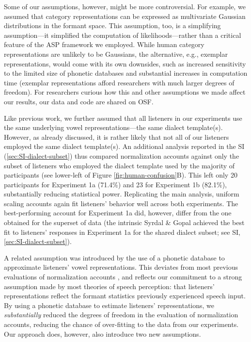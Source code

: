 \documentclass[preprint]{JASA}
\begin{document}
Some of our assumptions, however, might be more controversial. For example, we assumed that category representations can be expressed as multivariate Gaussian distributions in the formant space. This assumption, too, is a simplifying assumption---it simplified the computation of likelihoods---rather than a critical feature of the ASP framework we employed. While human category representations are unlikely to be Gaussians, the alternative, e.g., exemplar representations, would come with its own downsides, such as increased sensitivity to the limited size of phonetic databases and substantial increases in computation time (exemplar representations afford researchers with much larger degrees of freedom). For researchers curious how this and other assumptions we made affect our results, our data and code are shared on OSF.

Like previous work, we further assumed that all listeners in our experiments use the same underlying vowel representations---the same dialect template(s). However, as already discussed, it is rather likely that not all of our listeners employed the same dialect template(s). An additional analysis reported in the SI (\ref{sec:SI-dialect-subset}) thus compared normalization accounts against only the subset of listeners who employed the dialect template used by the majority of participants (see lower-left of Figure \ref{fig:human-confusion}B). This left only 20 participants for Experiment 1a (71.4\%) and 23 for Experiment 1b (82.1\%), substantially reducing statistical power. Replicating the main analysis, uniform scaling accounts again fit listeners' behavior well across both experiments. The best-performing account for Experiment 1a did, however, differ from the one obtained for the superset of data (the intrinsic Syrdal \& Gopal achieved the best fit to listeners' responses in Experiment 1a for the shared dialect subset; see SI, \ref{sec:SI-dialect-subset}).

A related assumption was introduced by the use of a phonetic database to approximate listeners' vowel representations. This deviates from most previous evaluations of normalization accounts \citetext{\citealp{mcmurray-jongman2011}; \citealp{barreda2021}; \citealp[but see][]{richter2017}}, and reflects our commitment to a strong assumption made by most theories of speech perception: that listeners' representations reflect the formant statistics previously experienced speech input. By using a phonetic database to estimate listeners' representations, we \emph{substantially} reduced the degrees of freedom in the evaluation of normalization accounts, reducing the chance of over-fitting to the data from our experiments. Our approach does, however, also introduce two new assumptions.
\end{document}
